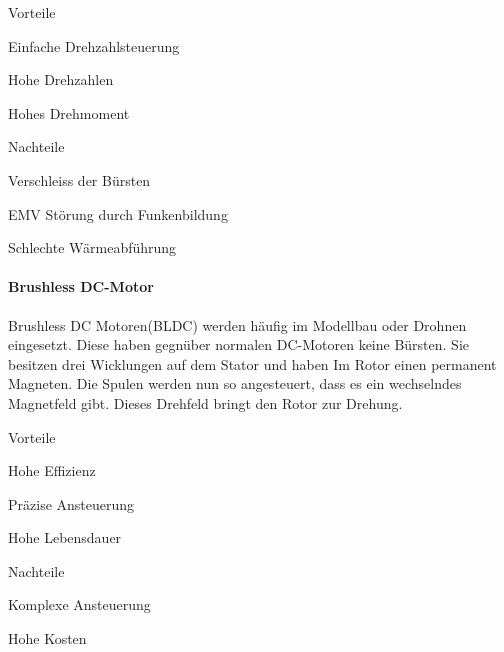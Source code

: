 \begin{minipage}[t]{0.48\textwidth}
\begin{items}
  \item [Vorteile]
  \item Einfache Drehzahlsteuerung
  \item Hohe Drehzahlen
  \item Hohes Drehmoment
\end{items}
\end{minipage}
\hfill
\begin{minipage}[t]{0.48\textwidth}
\begin{items}
  \item [Nachteile]
  \item Verschleiss der Bürsten
  \item EMV Störung durch Funkenbildung
  \item Schlechte Wärmeabführung
\end{items}
\end{minipage}

\paragraph{Brushless DC-Motor}

Brushless DC Motoren(BLDC) werden häufig im Modellbau oder Drohnen eingesetzt. Diese haben gegnüber normalen DC-Motoren keine Bürsten. Sie besitzen drei Wicklungen auf dem Stator und haben Im Rotor einen permanent Magneten. Die Spulen werden nun so angesteuert, dass es ein wechselndes Magnetfeld gibt. Dieses Drehfeld bringt den Rotor zur Drehung. 

\begin{minipage}[t]{0.48\textwidth}
\begin{items}
  \item [Vorteile]
  \item Hohe Effizienz
  \item Präzise Ansteuerung
  \item Hohe Lebensdauer
\end{items}
\end{minipage}
\hfill
\begin{minipage}[t]{0.48\textwidth}
\begin{items}
  \item [Nachteile]
  \item Komplexe Ansteuerung
  \item Hohe Kosten
\end{items}
\end{minipage}



